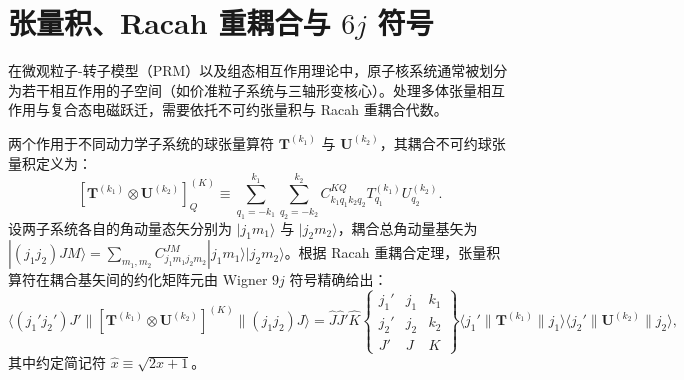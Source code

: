 \section{张量积、Racah 重耦合与 $6j$ 符号}\label{sec:appA-3}

在微观粒子-转子模型（PRM）以及组态相互作用理论中，原子核系统通常被划分为若干相互作用的子空间（如价准粒子系统与三轴形变核心）。处理多体张量相互作用与复合态电磁跃迁，需要依托不可约张量积与 Racah 重耦合代数。

两个作用于不同动力学子系统的球张量算符 $\mathbf{T}^{(k_1)}$ 与 $\mathbf{U}^{(k_2)}$，其耦合不可约球张量积定义为：
\begin{equation}\label{eq:appA-tensor-product-def}
[\mathbf{T}^{(k_1)} \otimes \mathbf{U}^{(k_2)}]_Q^{(K)} \equiv \sum_{q_1=-k_1}^{k_1} \sum_{q_2=-k_2}^{k_2} C_{k_1 q_1 k_2 q_2}^{K Q} T_{q_1}^{(k_1)} U_{q_2}^{(k_2)} .
\end{equation}
设两子系统各自的角动量态矢分别为 $|j_1 m_1\rangle$ 与 $|j_2 m_2\rangle$，耦合总角动量基矢为 $|(j_1 j_2) J M\rangle = \sum_{m_1, m_2} C_{j_1 m_1 j_2 m_2}^{J M} |j_1 m_1\rangle |j_2 m_2\rangle$。根据 Racah 重耦合定理，张量积算符在耦合基矢间的约化矩阵元由 Wigner $9j$ 符号精确给出：
\begin{equation}\label{eq:appA-9j-rme}
\langle (j_1' j_2') J' \| [\mathbf{T}^{(k_1)} \otimes \mathbf{U}^{(k_2)}]^{(K)} \| (j_1 j_2) J \rangle = \hat{J} \hat{J}' \hat{K} \begin{Bmatrix} j_1' & j_1 & k_1 \\ j_2' & j_2 & k_2 \\ J' & J & K \end{Bmatrix} \langle j_1' \| \mathbf{T}^{(k_1)} \| j_1 \rangle \langle j_2' \| \mathbf{U}^{(k_2)} \| j_2 \rangle ,
\end{equation}
其中约定简记符 $\hat{x} \equiv \sqrt{2x + 1}$。

